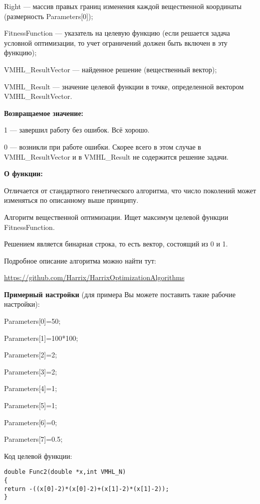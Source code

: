  Right --- массив правых границ изменения каждой вещественной координаты (размерность Parameters[0]);
 
 FitnessFunction --- указатель на целевую функцию (если решается задача условной оптимизации, то учет ограничений должен быть включен в эту функцию);
 
 VMHL\_ResultVector --- найденное решение (вещественный вектор);
 
 VMHL\_Result --- значение целевой функции в точке, определенной вектором VMHL\_ResultVector.

\textbf{Возвращаемое значение:} 

 1 --- завершил работу без ошибок. Всё хорошо.
 
 0 --- возникли при работе ошибки. Скорее всего в этом случае в VMHL\_ResultVector и в VMHL\_Result не содержится решение задачи.

\textbf{О функции:}

Отличается от стандартного генетического алгоритма, что число поколений может изменяться по описанному выше принципу.

Алгоритм вещественной оптимизации. Ищет максимум целевой функции FitnessFunction.

Решением является бинарная строка, то есть вектор, состоящий из 0 и 1.

Подробное описание алгоритма можно найти тут:

\href{https://github.com/Harrix/HarrixOptimizationAlgorithms/blob/master/\_HarrixOptimizationAlgorithms.pdf}{https://github.com/Harrix/HarrixOptimizationAlgorithms}

\textbf{Примерный настройки} (для примера Вы можете поставить такие рабочие настройки):

 Parameters[0]=50;
 
Parameters[1]=100*100;

Parameters[2]=2;

Parameters[3]=2;

Parameters[4]=1;

Parameters[5]=1;

Parameters[6]=0;

Parameters[7]=0.5;

Код целевой функции:
\begin{lstlisting}[caption=Оптимизируемая функция]
double Func2(double *x,int VMHL_N)
{
return -((x[0]-2)*(x[0]-2)+(x[1]-2)*(x[1]-2));
}
\end{lstlisting}